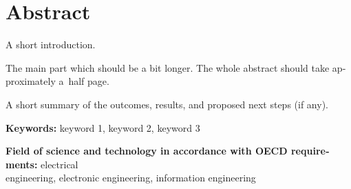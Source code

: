 \chapter*{Abstract}

\begin{otherlanguage}{english}

A short introduction.

The main part which should be a bit longer. The whole abstract should take approximately a~half page.

A short summary of the outcomes, results, and proposed next steps (if
any).

\bigskip
\noindent
\textbf{Keywords:} keyword 1, keyword 2, keyword 3

\bigskip
\noindent
\textbf{Field of science and technology in accordance with OECD
requirements:} electrical \\ engineering, electronic engineering,
information engineering

\end{otherlanguage}
